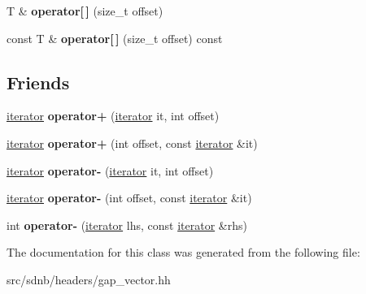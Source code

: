 \begin{DoxyCompactItemize}
\item 
\hypertarget{classSDNB_1_1GapVector_1_1iterator_a0794000c4e8173ba998ac69ec8441b31}{}T \& {\bfseries operator\mbox{[}$\,$\mbox{]}} (size\+\_\+t offset)\label{classSDNB_1_1GapVector_1_1iterator_a0794000c4e8173ba998ac69ec8441b31}

\item 
\hypertarget{classSDNB_1_1GapVector_1_1iterator_a0b5ad4d1b4c4050a6b221c938d8a360c}{}const T \& {\bfseries operator\mbox{[}$\,$\mbox{]}} (size\+\_\+t offset) const \label{classSDNB_1_1GapVector_1_1iterator_a0b5ad4d1b4c4050a6b221c938d8a360c}

\end{DoxyCompactItemize}
\subsection*{Friends}
\begin{DoxyCompactItemize}
\item 
\hypertarget{classSDNB_1_1GapVector_1_1iterator_ad276f1b756293ba5e93da0a53bb02996}{}\hyperlink{classSDNB_1_1GapVector_1_1iterator}{iterator} {\bfseries operator+} (\hyperlink{classSDNB_1_1GapVector_1_1iterator}{iterator} it, int offset)\label{classSDNB_1_1GapVector_1_1iterator_ad276f1b756293ba5e93da0a53bb02996}

\item 
\hypertarget{classSDNB_1_1GapVector_1_1iterator_ab3bcd660aaf8ec01c51e2f65f011c7d9}{}\hyperlink{classSDNB_1_1GapVector_1_1iterator}{iterator} {\bfseries operator+} (int offset, const \hyperlink{classSDNB_1_1GapVector_1_1iterator}{iterator} \&it)\label{classSDNB_1_1GapVector_1_1iterator_ab3bcd660aaf8ec01c51e2f65f011c7d9}

\item 
\hypertarget{classSDNB_1_1GapVector_1_1iterator_aa5112bbfcc346bf466075266f6862228}{}\hyperlink{classSDNB_1_1GapVector_1_1iterator}{iterator} {\bfseries operator-\/} (\hyperlink{classSDNB_1_1GapVector_1_1iterator}{iterator} it, int offset)\label{classSDNB_1_1GapVector_1_1iterator_aa5112bbfcc346bf466075266f6862228}

\item 
\hypertarget{classSDNB_1_1GapVector_1_1iterator_a8190f6ba087cab1c57a8f87d9403f6ae}{}\hyperlink{classSDNB_1_1GapVector_1_1iterator}{iterator} {\bfseries operator-\/} (int offset, const \hyperlink{classSDNB_1_1GapVector_1_1iterator}{iterator} \&it)\label{classSDNB_1_1GapVector_1_1iterator_a8190f6ba087cab1c57a8f87d9403f6ae}

\item 
\hypertarget{classSDNB_1_1GapVector_1_1iterator_a41d99fcef815c2090e57789a8ac73486}{}int {\bfseries operator-\/} (\hyperlink{classSDNB_1_1GapVector_1_1iterator}{iterator} lhs, const \hyperlink{classSDNB_1_1GapVector_1_1iterator}{iterator} \&rhs)\label{classSDNB_1_1GapVector_1_1iterator_a41d99fcef815c2090e57789a8ac73486}

\end{DoxyCompactItemize}


The documentation for this class was generated from the following file\+:\begin{DoxyCompactItemize}
\item 
src/sdnb/headers/gap\+\_\+vector.\+hh\end{DoxyCompactItemize}
